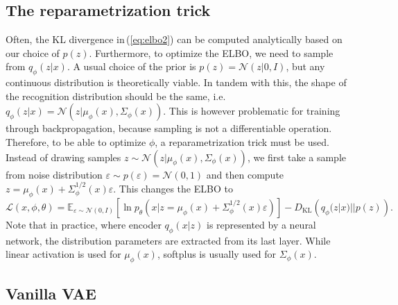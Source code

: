 \subsection{The reparametrization trick}

Often, the KL divergence in\,(\ref{eq:elbo2}) can be computed analytically
based on our choice of $p(z)$. Furthermore, to optimize the ELBO,
we need to sample from $q_{\phi}(z|x)$. A usual choice of the prior
is $p(z)=\mathcal{N}(z|0,I)$, but any continuous distribution is
theoretically viable. In tandem with this, the shape of the recognition
distribution should be the same, i.e. $q_{\phi}(z|x)=\mathcal{N}(z|\mu_{\phi}(x),\Sigma_{\phi}(x))$.
This is however problematic for training through backpropagation,
because sampling is not a differentiable operation. Therefore, to
be able to optimize $\phi$, a reparametrization trick must be used.
Instead of drawing samples $z\sim\mathcal{N}(z|\mu_{\phi}(x),\Sigma_{\phi}(x))$,
we first take a sample from noise distribution $\varepsilon\sim p(\varepsilon)=\mathcal{N}(0,1)$
and then compute $z=\mu_{\phi}(x)+\Sigma_{\phi}^{1/2}(x)\varepsilon$.
This changes the ELBO to
\begin{equation}
\mathcal{L}(x,\phi,\theta)=\mathbb{E}_{\varepsilon\sim\mathcal{N}(0,I)}\left[\ln p_{\theta}(x|z=\mu_{\phi}(x)+\Sigma_{\phi}^{1/2}(x)\varepsilon)\right]-D_{\text{KL}}\left(q_{\phi}(z|x)||p(z)\right).\label{eq:vae_loss}
\end{equation}
Note that in practice, where encoder $q_{\phi}(x|z)$ is represented
by a neural network, the distribution parameters are extracted from
its last layer. While linear activation is used for $\mu_{\phi}(x)$,
softplus is usually used for $\Sigma_{\phi}(x)$.

\subsection{Vanilla VAE\label{sec:vae_vanilla}}

